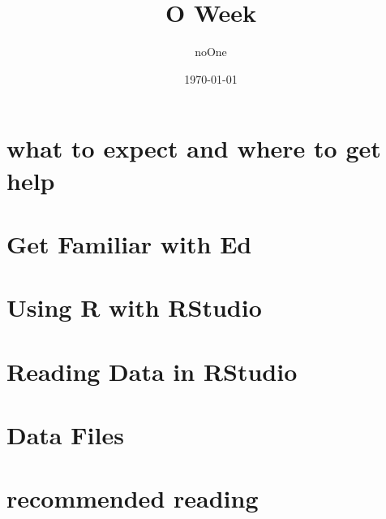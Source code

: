 \documentclass[11pt]{article}
\title{O Week}
\author{noOne}
\date{\today}
\begin{document}
\maketitle
\section{what to expect and where to get help}\label{sec:what to expect and where to get help}

\blindtext

\section{Get Familiar with Ed}\label{sec:Get Familiar with Ed}

\blindtext

\section{Using R with RStudio}\label{sec:Using R with RStudio}

\blindtext

\section{Reading Data in RStudio}\label{sec:Reading Data in RStudio}

\blindtext

\section{Data Files}\label{sec:Data Files}

\blindtext

\section{recommended reading}\label{sec:recommended reading}

\blindtext
\end{document}
